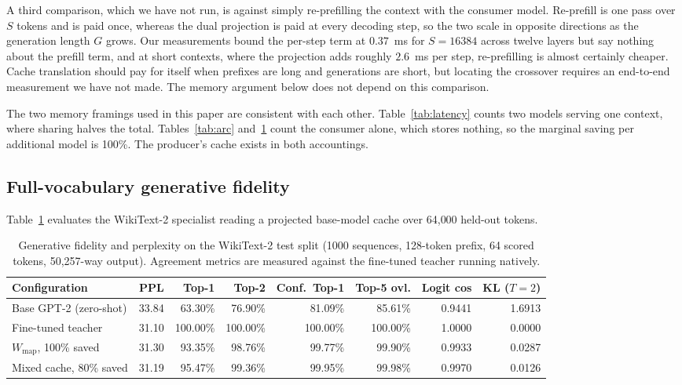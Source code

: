 \documentclass[11pt]{article}
\begin{document}
A third comparison, which we have not run, is against simply re-prefilling the context with
the consumer model. Re-prefill is one pass over $S$ tokens and is paid once, whereas the
dual projection is paid at every decoding step, so the two scale in opposite directions as
the generation length $G$ grows. Our measurements bound the per-step term at $0.37$~ms for
$S = 16384$ across twelve layers but say nothing about the prefill term, and at short
contexts, where the projection adds roughly $2.6$~ms per step, re-prefilling is almost
certainly cheaper. Cache translation should pay for itself when prefixes are long and
generations are short, but locating the crossover requires an end-to-end measurement we
have not made. The memory argument below does not depend on this comparison.

The two memory framings used in this paper are consistent with each other.
Table~\ref{tab:latency} counts two models serving one context, where sharing halves the
total. Tables~\ref{tab:arc} and~\ref{tab:fidelity} count the consumer alone, which stores
nothing, so the marginal saving per additional model is 100\%. The producer's cache exists
in both accountings.

\subsection{Full-vocabulary generative fidelity}

Table~\ref{tab:fidelity} evaluates the WikiText-2 specialist reading a projected base-model
cache over 64{,}000 held-out tokens.

\begin{table}[ht]
\centering
\footnotesize
\setlength{\tabcolsep}{4.5pt}
\caption{Generative fidelity and perplexity on the WikiText-2 test split (1000 sequences,
128-token prefix, 64 scored tokens, 50{,}257-way output). Agreement metrics are measured
against the fine-tuned teacher running natively.}
\label{tab:fidelity}
\begin{tabular}{lrrrrrrr}
\toprule
Configuration & PPL & Top-1 & Top-2 & Conf.\ Top-1 & Top-5 ovl. & Logit cos & KL ($T{=}2$) \\
\midrule
Base GPT-2 (zero-shot)      & 33.84 & 63.30\% & 76.90\% & 81.09\% & 85.61\% & 0.9441 & 1.6913 \\
Fine-tuned teacher          & 31.10 & 100.00\% & 100.00\% & 100.00\% & 100.00\% & 1.0000 & 0.0000 \\
\midrule
$W_{\mathrm{map}}$, 100\% saved & 31.30 & 93.35\% & 98.76\% & 99.77\% & 99.90\% & 0.9933 & 0.0287 \\
Mixed cache, 80\% saved     & 31.19 & 95.47\% & 99.36\% & 99.95\% & 99.98\% & 0.9970 & 0.0126 \\
\bottomrule
\end{tabular}
\end{table}
\end{document}
